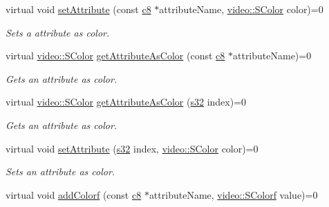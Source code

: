 \begin{DoxyCompactItemize}
\mbox{\label{classirr_1_1io_1_1IAttributes_afee757df879cb6bac464ae5000caf386}} 
virtual void \hyperlink{classirr_1_1io_1_1IAttributes_afee757df879cb6bac464ae5000caf386}{set\+Attribute} (const \hyperlink{namespaceirr_a9395eaea339bcb546b319e9c96bf7410}{c8} $\ast$attribute\+Name, \hyperlink{classirr_1_1video_1_1SColor}{video\+::\+S\+Color} color)=0
\begin{DoxyCompactList}\small\item\em Sets a attribute as color. \end{DoxyCompactList}\item 
virtual \hyperlink{classirr_1_1video_1_1SColor}{video\+::\+S\+Color} \hyperlink{classirr_1_1io_1_1IAttributes_a72b576b9ba7332952cdb86c60dae2fee}{get\+Attribute\+As\+Color} (const \hyperlink{namespaceirr_a9395eaea339bcb546b319e9c96bf7410}{c8} $\ast$attribute\+Name)=0
\begin{DoxyCompactList}\small\item\em Gets an attribute as color. \end{DoxyCompactList}\item 
virtual \hyperlink{classirr_1_1video_1_1SColor}{video\+::\+S\+Color} \hyperlink{classirr_1_1io_1_1IAttributes_ac3ef831227f7c9383e3e9144ae877c60}{get\+Attribute\+As\+Color} (\hyperlink{namespaceirr_ac66849b7a6ed16e30ebede579f9b47c6}{s32} index)=0
\begin{DoxyCompactList}\small\item\em Gets an attribute as color. \end{DoxyCompactList}\item 
\mbox{\label{classirr_1_1io_1_1IAttributes_a852d8937c6dafe90f290c1a0322cacf7}} 
virtual void \hyperlink{classirr_1_1io_1_1IAttributes_a852d8937c6dafe90f290c1a0322cacf7}{set\+Attribute} (\hyperlink{namespaceirr_ac66849b7a6ed16e30ebede579f9b47c6}{s32} index, \hyperlink{classirr_1_1video_1_1SColor}{video\+::\+S\+Color} color)=0
\begin{DoxyCompactList}\small\item\em Sets an attribute as color. \end{DoxyCompactList}\item 
\mbox{\label{classirr_1_1io_1_1IAttributes_a3107a3b74356b6e456f5a0bdf855e510}} 
virtual void \hyperlink{classirr_1_1io_1_1IAttributes_a3107a3b74356b6e456f5a0bdf855e510}{add\+Colorf} (const \hyperlink{namespaceirr_a9395eaea339bcb546b319e9c96bf7410}{c8} $\ast$attribute\+Name, \hyperlink{classirr_1_1video_1_1SColorf}{video\+::\+S\+Colorf} value)=0

\end{DoxyCompactItemize}
